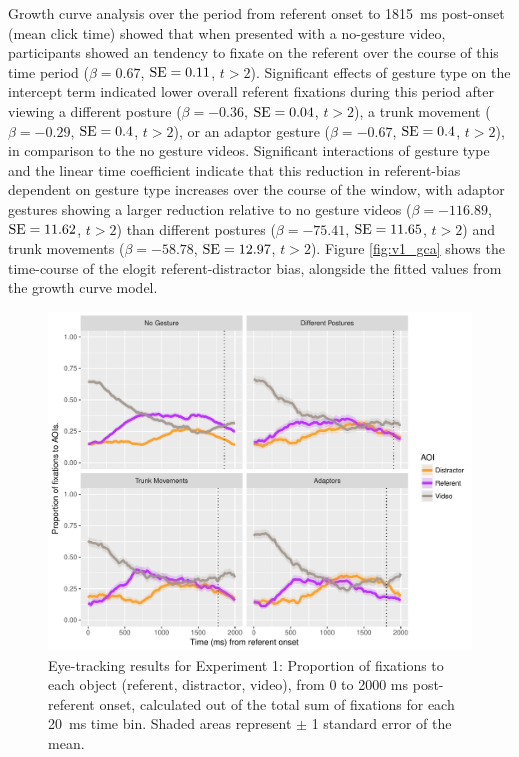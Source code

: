 \documentclass[a4paper,man,natbib]{apa6}
\newcommand{\resultsLM}[3]{$\beta = #1$, $\textnormal{SE} = #2$, $t #3$}
\begin{document}
Growth curve analysis over the period from referent onset to 1815~ms post-onset (mean click time) showed that when presented with a no-gesture video, participants showed an tendency to fixate on the referent over the course of this time period (\resultsLM{0.67}{0.11}{>2}). %
Significant effects of gesture type on the intercept term indicated lower overall referent fixations during this period after viewing a different posture (\resultsLM{-0.36}{0.04}{>2}), a trunk movement (\resultsLM{-0.29}{0.4}{>2}), or an adaptor gesture (\resultsLM{-0.67}{0.4}{>2}), in comparison to the no gesture videos.
Significant interactions of gesture type and the linear time coefficient indicate that this reduction in referent-bias dependent on gesture type increases over the course of the window, with adaptor gestures showing a larger reduction relative to no gesture videos (\resultsLM{-116.89}{11.62}{>2}) than different postures (\resultsLM{-75.41}{11.65}{>2}) and trunk movements (\resultsLM{-58.78}{12.97}{>2}). %
Figure \ref{fig:v1_gca} shows the time-course of the elogit referent-distractor bias, alongside the fitted values from the growth curve model. 

\begin{figure}[Ht]
  \centering
	\includegraphics[width=\linewidth]{./img/e7_fixations.pdf}
  \caption{Eye-tracking results for Experiment 1: Proportion of fixations to each object (referent, distractor, video), from 0 to 2000 ms post-referent onset, calculated out of the total sum of fixations for each 20~ms time bin. Shaded areas represent $\pm$ 1 standard error of the mean.}
  \label{fig:v1_eye}
\end{figure}
\end{document}
